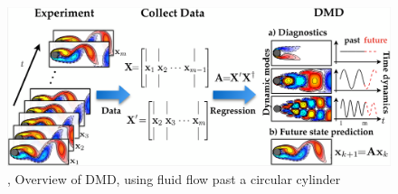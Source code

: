 \begin{figure}[!hbt]
\centering
\includegraphics[width=\linewidth]{Images/fig3p1.png}
\caption{\cite{dmdkutz}, Overview of DMD, using fluid flow past a circular cylinder}
\label{fig
}
\end{figure}

